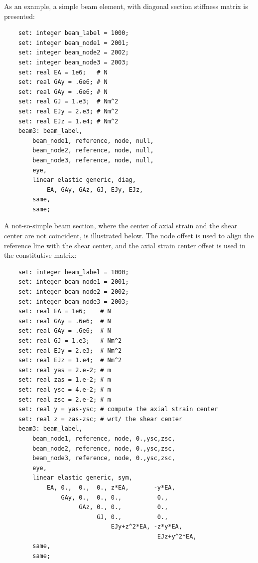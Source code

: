 \noindent
As an example, a simple beam element, with diagonal section stiffness 
matrix is presented:
\begin{verbatim}
    set: integer beam_label = 1000;
    set: integer beam_node1 = 2001;
    set: integer beam_node2 = 2002;
    set: integer beam_node3 = 2003;
    set: real EA = 1e6;   # N
    set: real GAy = .6e6; # N
    set: real GAy = .6e6; # N
    set: real GJ = 1.e3;  # Nm^2
    set: real EJy = 2.e3; # Nm^2
    set: real EJz = 1.e4; # Nm^2
    beam3: beam_label,
        beam_node1, reference, node, null,
        beam_node2, reference, node, null,
        beam_node3, reference, node, null,
        eye,
        linear elastic generic, diag,
            EA, GAy, GAz, GJ, EJy, EJz,
        same,
        same;
\end{verbatim}

\noindent
A not-so-simple beam section, where the center of axial strain 
and the shear center are not coincident, is illustrated below.
The node offset is used to align the reference line 
with the shear center, and the axial strain center offset 
is used in the constitutive matrix:
\begin{verbatim}
    set: integer beam_label = 1000;
    set: integer beam_node1 = 2001;
    set: integer beam_node2 = 2002;
    set: integer beam_node3 = 2003;
    set: real EA = 1e6;    # N
    set: real GAy = .6e6;  # N
    set: real GAy = .6e6;  # N
    set: real GJ = 1.e3;   # Nm^2
    set: real EJy = 2.e3;  # Nm^2
    set: real EJz = 1.e4;  # Nm^2
    set: real yas = 2.e-2; # m
    set: real zas = 1.e-2; # m
    set: real ysc = 4.e-2; # m
    set: real zsc = 2.e-2; # m
    set: real y = yas-ysc; # compute the axial strain center
    set: real z = zas-zsc; # wrt/ the shear center
    beam3: beam_label,
        beam_node1, reference, node, 0.,ysc,zsc,
        beam_node2, reference, node, 0.,ysc,zsc,
        beam_node3, reference, node, 0.,ysc,zsc,
        eye,
        linear elastic generic, sym,
            EA, 0.,  0.,  0., z*EA,       -y*EA,
                GAy, 0.,  0., 0.,          0.,
                     GAz, 0., 0.,          0.,
                          GJ, 0.,          0.,
                              EJy+z^2*EA, -z*y*EA,
                                           EJz+y^2*EA,
        same,
        same;
\end{verbatim}


